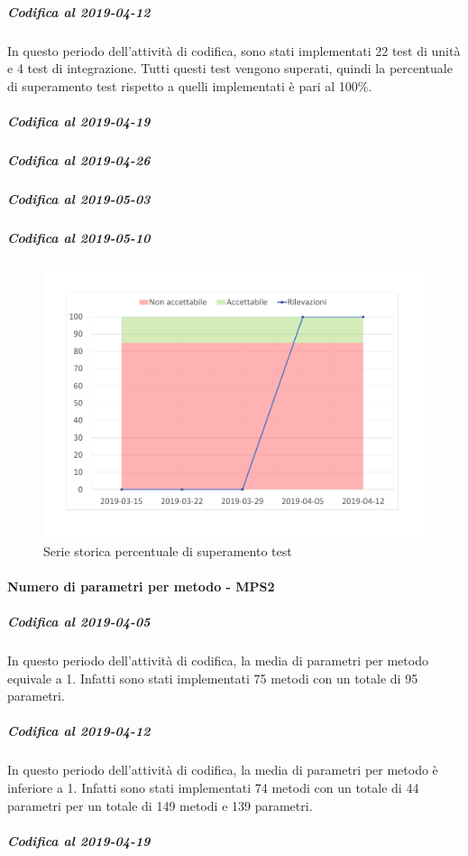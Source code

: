 \subparagraph{Codifica al 2019-04-12}
In questo periodo dell'attività di codifica, sono stati implementati 22 test di unità e 4 test di integrazione. Tutti questi test vengono superati, quindi la percentuale di superamento test rispetto a quelli implementati è pari al 100\%.

\subparagraph{Codifica al 2019-04-19}


\subparagraph{Codifica al 2019-04-26}


\subparagraph{Codifica al 2019-05-03}


\subparagraph{Codifica al 2019-05-10}



\begin{figure}[H]
	\centering
	\includegraphics[scale=0.6]{images/resoconto/MPS1Chart.pdf}
	\caption{Serie storica percentuale di superamento test}	
\end{figure}

\paragraph{Numero di parametri per metodo - MPS2}
\subparagraph{Codifica al 2019-04-05}
In questo periodo dell'attività di codifica, la media di parametri per metodo equivale a 1. Infatti sono stati implementati 75 metodi con un totale di 95 parametri.

\subparagraph{Codifica al 2019-04-12}
In questo periodo dell'attività di codifica, la media di parametri per metodo è inferiore a 1. Infatti sono stati implementati 74 metodi con un totale di 44 parametri per un totale di 149 metodi e 139 parametri.

\subparagraph{Codifica al 2019-04-19}


